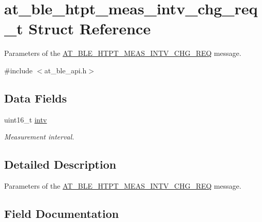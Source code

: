 \hypertarget{structat__ble__htpt__meas__intv__chg__req__t}{}\section{at\+\_\+ble\+\_\+htpt\+\_\+meas\+\_\+intv\+\_\+chg\+\_\+req\+\_\+t Struct Reference}
\label{structat__ble__htpt__meas__intv__chg__req__t}


Parameters of the \mbox{\hyperlink{at__ble__api_8h_a3324640b95f33169515f89738ed5baeba57016c060c7a099f974236b36311434d}{A\+T\+\_\+\+B\+L\+E\+\_\+\+H\+T\+P\+T\+\_\+\+M\+E\+A\+S\+\_\+\+I\+N\+T\+V\+\_\+\+C\+H\+G\+\_\+\+R\+EQ}} message.  




{\ttfamily \#include $<$at\+\_\+ble\+\_\+api.\+h$>$}

\subsection*{Data Fields}
\begin{DoxyCompactItemize}
\item 
uint16\+\_\+t \mbox{\hyperlink{structat__ble__htpt__meas__intv__chg__req__t_a0240debbc3420454fe136feb2b4403d3}{intv}}
\begin{DoxyCompactList}\small\item\em Measurement interval. \end{DoxyCompactList}\end{DoxyCompactItemize}


\subsection{Detailed Description}
Parameters of the \mbox{\hyperlink{at__ble__api_8h_a3324640b95f33169515f89738ed5baeba57016c060c7a099f974236b36311434d}{A\+T\+\_\+\+B\+L\+E\+\_\+\+H\+T\+P\+T\+\_\+\+M\+E\+A\+S\+\_\+\+I\+N\+T\+V\+\_\+\+C\+H\+G\+\_\+\+R\+EQ}} message. 

\subsection{Field Documentation}
\mbox{\label{structat__ble__htpt__meas__intv__chg__req__t_a0240debbc3420454fe136feb2b4403d3}} 
